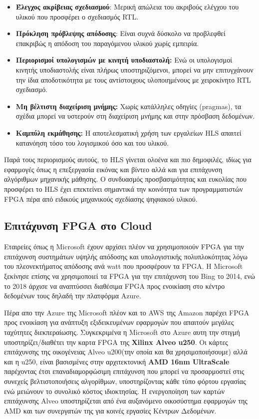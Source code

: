 \begin{itemize}
  \item \textbf{Έλεγχος ακρίβειας σχεδιασμού}: Μερική απώλεια του ακριβούς ελέγχου του υλικού που προσφέρει ο σχεδιασμός RTL.
  
  \item \textbf{Πρόκληση πρόβλεψης απόδοσης}: Είναι συχνά δύσκολο να προβλεφθεί επακριβώς η απόδοση του παραγόμενου υλικού χωρίς εμπειρία.

  \item \textbf{Περιορισμοί υπολογισμών με κινητή υποδιαστολή:} Ενώ οι υπολογισμοί κινητής υποδιαστολής είναι πλήρως υποστηριζόμενοι, μπορεί να μην επιτυγχάνουν την ίδια αποδοτικότητα με τους αντίστοιχους υλοποιημένους με χειροκίνητο RTL σχεδιασμό.
  
  \item \textbf{Μη βέλτιστη διαχείριση μνήμης:} Χωρίς κατάλληλες οδηγίες (pragmas), τα σχέδια μπορεί να υστερούν στη διαχείριση μνήμης και στην πρόσβαση δεδομένων.
  
  \item \textbf{Καμπύλη εκμάθησης:} Η αποτελεσματική χρήση των εργαλείων HLS απαιτεί κατανόηση τόσο του λογισμικού όσο και του υλικού.
\end{itemize}

Παρά τους περιορισμούς αυτούς, το HLS γίνεται ολοένα και πιο δημοφιλές, ιδίως για εφαρμογές όπως η επεξεργασία εικόνας και βίντεο αλλά και για επιτάχυνση αλγόριθμων μηχανικής μάθησης.
Ο συνδυασμός προσβασιμότητας και ευκολίας που προσφέρει το HLS έχει επεκτείνει σημαντικά την κοινότητα των προγραμματιστών FPGA πέρα από ειδικούς μηχανικούς σχεδίασης ψηφιακού υλικού.

\subsection{Επιτάχυνση FPGA στο Cloud}


Εταιρείες όπως η Microsoft έχουν αρχίσει πλέον να χρησιμοποιούν FPGA για την επιτάχυνση συστημάτων υψηλής απόδοσης και υπολογιστικής πολυπλοκότητας λόγω του πλεονεκτήματος απόδοσης ανά watt που προσφέρουν τα FPGA. 
Η Microsoft ξεκίνησε επίσης να χρησιμοποιεί τα FPGA για την επιτάχυνση του Bing το 2014, ενώ το 2018 άρχισε να αναπτύσσει διαθέσιμα FPGA προς ενοικίαση
στο κέντρο δεδομένων τους δηλαδή την πλατφόρμα Azure.

Πέρα απο την Azure της Microsoft πλέον και το AWS της Amazon παρέχει FPGA προς ενοικίαση για ανάπτυξη εξιδεικευμένων εφαρμογών
που απαιτούν μεγάλες ταχύτητες διεκπεραίωσης. Συγκεκριμένα η Microsoft στο Azure αυτη την στιγμή υποστηρίζει/διαθέτει την καρτα FPGA της \textbf{Xilinx Alveo u250}.
Οι κάρτες επιτάχυνσης της οικογένειας Alveo u200(την οποία και θα χρησιμοποιήσουμε) αλλά και η u250,
είναι βασισμένες στην αρχιτεκτονική \textbf{AMD 16nm UltraScale} παρέχοντας έτσι επαναδιαμορφώσιμη επιτάχυνση που μπορεί να προσαρμοστεί στις συνεχείς βελτιστοποιήσεις
αλγορίθμων, υποστηρίζοντας κάθε τύπο φόρτου εργασίας ενώ μειώνουν το συνολικό κόστος ιδιοκτησίας. Η ενεργοποίηση των καρτών επιτάχυνσης Alveo υποστηρίζεται από ένα
αυξανόμενο οικοσύστημα εφαρμογών της AMD και των συνεργατών της για κοινές εργασίες Κέντρων Δεδομένων.

